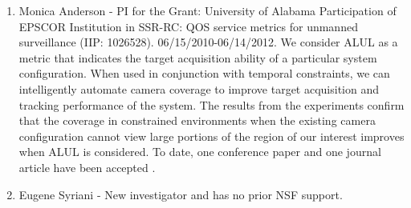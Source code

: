 \begin{enumerate}
\item Monica Anderson - PI for the Grant: University of Alabama Participation of EPSCOR Institution in SSR-RC: QOS service metrics for unmanned surveillance (IIP: 1026528).  06/15/2010-06/14/2012. We consider ALUL as a metric that indicates the target acquisition ability of a particular system configuration. When used in conjunction with temporal constraints, we can intelligently automate camera coverage to improve target acquisition and tracking performance of the system. The results from the experiments confirm that the coverage in constrained environments when the existing camera configuration cannot view large portions of the region of our interest improves when ALUL is considered.  To date, one conference paper and one journal article have been accepted \cite{Veluchamy2011,Dukeman2011}.
\item Eugene Syriani - New investigator and has no prior NSF support.

\end{enumerate}
